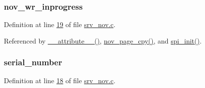 \hypertarget{a00060_a56fe014653ebdce270aeac664bf86e65}{
\subsubsection[{nov\+\_\+wr\+\_\+inprogress}]{ nov\+\_\+wr\+\_\+inprogress}}\label{a00060_a56fe014653ebdce270aeac664bf86e65}


Definition at line \hyperlink{a00060_source_l00019}{19} of file \hyperlink{a00060_source}{srv\+\_\+nov.\+c}.



Referenced by \hyperlink{a00041_source_l00025}{\+\_\+\+\_\+attribute\+\_\+\+\_\+()}, \hyperlink{a00060_source_l00663}{nov\+\_\+page\+\_\+cpy()}, and \hyperlink{a00032_source_l00030}{spi\+\_\+init()}.

\hypertarget{a00060_a728c5fe7bc16e168a8f93fba18ee5561}{
\subsubsection[{serial\+\_\+number}]{ serial\+\_\+number}}\label{a00060_a728c5fe7bc16e168a8f93fba18ee5561}


Definition at line \hyperlink{a00060_source_l00018}{18} of file \hyperlink{a00060_source}{srv\+\_\+nov.\+c}.

